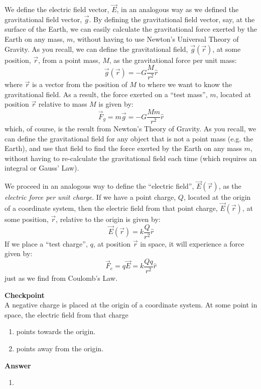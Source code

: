 We define the electric field vector, $\vec E$, in an analogous way as we defined the gravitational field vector, $\vec g$. By defining the gravitational field vector, say, at the surface of the Earth, we can easily calculate the gravitational force exerted by the Earth on any mass, $m$, without having to use Newton's Universal Theory of Gravity. As you recall, we can define the gravitational field, $\vec g(\vec r)$, at some position, $\vec r$, from a point mass, $M$, as the gravitational force per unit mass:
\begin{equation}
\vec g(\vec r) = -G \frac{M}{r^2}\hat r
\end{equation}
where $\vec r$ is a vector from the position of $M$ to where we want to know the gravitational field. As a result, the force exerted on a ``test mass'', $m$, located at position $\vec r$ relative to mass $M$ is given by:
\begin{equation}
\vec F_g=m\vec g= -G\frac{Mm}{r^2}\hat r
\end{equation}
which, of course, is the result from Newton's Theory of Gravity. As you recall, we can define the gravitational field for  any object that is not a point mass (e.g. the Earth), and use that field to find the force exerted by the Earth on any mass $m$, without having to re-calculate the gravitational field each time (which requires an integral or Gauss' Law).

We proceed in an analogous way to define the ``electric field'', $\vec E(\vec r)$, as the \textit{electric force per unit charge}. If we have a point charge, $Q$, located at the origin of a coordinate system, then the electric field from that point charge, $\vec E(\vec r)$, at some position, $\vec r$, relative to the origin is given by:
\begin{equation}
\boxed{\vec E(\vec r) = k\frac{Q}{r^2}\hat r}
\end{equation}
If we place a ``test charge'', $q$, at position $\vec r$ in space, it will experience a force given by:
\begin{equation}
\vec F_e=q\vec E=k\frac{Qq}{r^2}\hat r
\end{equation}
just as we find from Coulomb's Law.

\begin{framed}
\textbf{Checkpoint}\\
A negative charge is placed at the origin of a coordinate system. At some point in space, the electric field from that charge

\begin{enumerate}
\item points towards the origin.
\item points away from the origin.
\end{enumerate}

\begin{framed}
\textbf{Answer}\\
\begin{enumerate}
\item
\end{enumerate}
\end{framed}
\end{framed}

